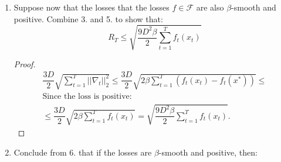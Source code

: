 \documentclass[12pt]{report}
\begin{document}
\begin{enumerate}
                Show that if $f: K\to \R$ is $\beta$-smooth and achieves a minimum at $x^* \in K$, then $\forall x \in K$:
                \[
                    ||\nabla f(x)||_2^2 \leq 2\beta (f(x) - f(x^*)).  
                \]
                \begin{proof}
                    Since smoothness and the optimality of $x^*$ ($f:\ K\to \R$ is $\beta$-smooth and achieves minimum at $x^*\in K$), we have:
                    \[
                        \begin{array}{c}
                            \displaystyle f(x^*) \leq f\left(x - \dfrac{1}{\beta}\nabla f(x)\right) \leq f(x) - \dfrac{1}{\beta} ||\nabla f(x)||_2^2 + \dfrac{1}{2\beta} ||\nabla f(x)||_2^2 \leq \\[1cm]           
                            \displaystyle f(x) - \dfrac{1}{2\beta} ||\nabla f(x)||_2^2 \Rightarrow f(x^*) \leq f(x) - \dfrac{1}{2\beta} ||\nabla f(x)||_2^2                
                        \end{array}
                    \]
                    Multiplying both sides by $2\beta$ we obtain:
                    \[
                        ||\nabla f(x)||_2^2 \leq 2\beta \cdot \left(f(x) - f(x^*)\right).  
                    \]
                \end{proof}
                \item Suppose now that the losses that the losses $f\in \mathcal{F}$ are also $\beta$-smooth and positive. Combine 3. and 5. to show that:
                \[
                    R_T \leq \sqrt{\displaystyle \dfrac{9D^2\beta}{2} \sum\limits_{t=1}^T f_t(x_t)}  
                \]
                \begin{proof}
                    \[
                        \begin{array}{c}
                            \displaystyle \dfrac{3D}{2}\sqrt{\displaystyle \sum\limits_{t=1}^T ||\nabla_t||_2^2} \leq \dfrac{3D}{2}\sqrt{\displaystyle 2\beta \sum\limits_{t=1}^T \left(f_t(x_t) - f_t(x^*)\right)} \leq \\[1cm]
                            \text{Since the loss is positive: } \\[0.5cm]
                            \leq \dfrac{3D}{2}\sqrt{\displaystyle 2\beta \sum\limits_{t=1}^T f_t(x_t)} = \sqrt{\displaystyle \dfrac{9D^2\beta}{2}\sum\limits_{t=1}^T f_t(x_t)}.                    
                        \end{array}
                    \]
                \end{proof}
                \item Conclude from 6. that if the losses are $\beta$-smooth and positive, then:

\end{enumerate}
\end{document}
